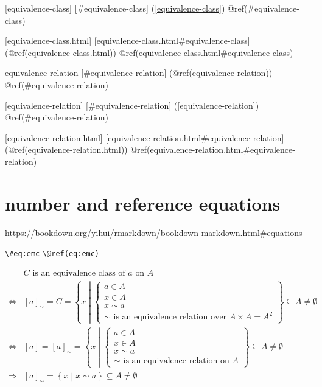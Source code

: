 \documentclass[
]{book}
\theoremstyle{definition}
\theoremstyle{definition}
\theoremstyle{definition}
\theoremstyle{definition}
\theoremstyle{remark}
\begin{document}
{[}equivalence-class{]} {[}\#equivalence-class{]} (\ref{equivalence-class}) @ref(\#equivalence-class)

{[}equivalence-class.html{]} {[}equivalence-class.html\#equivalence-class{]} (@ref(equivalence-class.html)) @ref(equivalence-class.html\#equivalence-class)

\protect\hyperlink{equivalence-relation}{equivalence relation} {[}\#equivalence relation{]} (@ref(equivalence relation)) @ref(\#equivalence relation)

{[}equivalence-relation{]} {[}\#equivalence-relation{]} (\ref{equivalence-relation}) @ref(\#equivalence-relation)

{[}equivalence-relation.html{]} {[}equivalence-relation.html\#equivalence-relation{]} (@ref(equivalence-relation.html)) @ref(equivalence-relation.html\#equivalence-relation)

\hypertarget{number-and-reference-equations}{%
\section{number and reference equations}\label{number-and-reference-equations}}

\url{https://bookdown.org/yihui/rmarkdown/bookdown-markdown.html\#equations}

\texttt{\textbackslash{}\#eq:emc}
\texttt{\textbackslash{}@ref(eq:emc)}

\begin{align*}
 & C\text{ is an equivalence class of }a\text{ on }A\\
\Leftrightarrow & \left[a\right]_{\sim}=C=\left\{ x\middle|\begin{cases}
a\in A\\
x\in A\\
x\sim a\\
\sim\text{ is an equivalence relation over }A\times A=A^{2}
\end{cases}\right\} \subseteq A\ne\emptyset\\
\Leftrightarrow & \left[a\right]=\left[a\right]_{\sim}=\left\{ x\middle|\begin{cases}
a\in A\\
x\in A\\
x\sim a\\
\sim\text{ is an equivalence relation on }A
\end{cases}\right\} \subseteq A\ne\emptyset\\
\Rightarrow & \left[a\right]_{\sim}=\left\{ x\middle|x\sim a\right\} \subseteq A\ne\emptyset
\label{eq:eqclass}
\end{align*}
\end{document}
